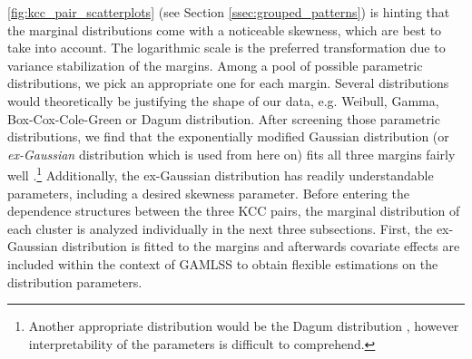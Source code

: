 
\autoref{fig:kcc_pair_scatterplots} (see Section \ref{ssec:grouped_patterns}) is hinting that the marginal distributions come with a noticeable skewness, which are best to take into account. The logarithmic scale is the preferred transformation due to variance stabilization of the margins. Among a pool of possible parametric distributions, we pick an appropriate one for each margin. Several distributions would theoretically be justifying the shape of our data, e.g. Weibull, Gamma, Box-Cox-Cole-Green or Dagum distribution. After screening those parametric distributions, we find that the exponentially modified Gaussian distribution (or \textit{ex-Gaussian} distribution which is used from here on) fits all three margins fairly well \citep{grushka1972characterization}.\footnote{Another appropriate distribution would be the Dagum distribution \citep{dagum1975model}, however interpretability of the parameters is difficult to comprehend.} Additionally, the ex-Gaussian distribution has readily understandable parameters, including a desired skewness parameter.
Before entering the dependence structures between the three \ac{KCC} pairs, the marginal distribution of each cluster is analyzed individually in the next three subsections. First, the ex-Gaussian distribution is fitted to the margins and afterwards covariate effects are included within the context of \ac{GAMLSS} to obtain flexible estimations on the distribution parameters. 







